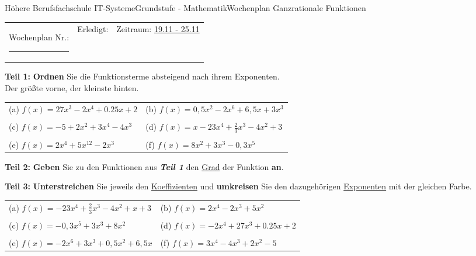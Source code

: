 \documentclass[oneside,openany,headings=optiontotoc,11pt,numbers=noenddot]{scrreprt}
\begin{document}
	\begin{worksheet}{Höhere Berufsfachschule IT-Systeme}{Grundstufe - Mathematik}{Wochenplan Ganzrationale Funktionen}
		\noindent
		\begin{tabularx}{\textwidth}{XXl}
			Wochenplan Nr.: \rule{0.15\textwidth}{1pt} & Erledigt: & Zeitraum: \underline{19.11 - 25.11}
		\end{tabularx}
	
		\begin{framed}
			\noindent
			\textbf{Teil 1:} \textbf{Ordnen} Sie die Funktionsterme absteigend nach ihrem Exponenten.\\
			Der größte vorne, der kleinste hinten.
			\par\noindent
			\begin{tabularx}{\textwidth}{XX}
				(a) \(f(x) = 27x^3 - 2x^4 + 0.25x + 2\) & (b) \(f(x) = 0,5x^2 - 2x^6 +6,5x + 3x^3\)\\
				\\
				(c) \(f(x) = -5 + 2x^2 + 3x^4 - 4x^3\) & (d) \(f(x) = x - 23x^4 + \frac{2}{3}x^3 - 4x^2 + 3\)\\
				\\
				(e) \(f(x) = 2x^4+5x^12-2x^3\) & (f) \(f(x) = 8x^2 + 3x^3 - 0,3x^5\)\\
			\end{tabularx}
		\end{framed}
		\begin{framed}
			\noindent
			\textbf{Teil 2:} \textbf{Geben} Sie zu den Funktionen aus \textit{\textbf{Teil 1}} den \underline{Grad} der Funktion \textbf{an}.
		\end{framed}
		\begin{framed}
			\noindent
			\textbf{Teil 3:} \textbf{Unterstreichen} Sie jeweils den \underline{Koeffizienten} und \textbf{umkreisen} Sie den dazugehörigen \underline{Exponenten} mit der gleichen Farbe.\\
			\par\noindent
			\begin{tabularx}{\textwidth}{XX}
				(a) \(f(x) = - 23x^4 + \frac{2}{3}x^3 - 4x^2 + x + 3\) & (b) \(f(x) = 2x^4- 2x^3 +5x^2\)\\
				\\
				(c) \(f(x) = -0,3x^5 + 3x^3 + 8x^2\) & (d) \(f(x) = -2x^4 + 27x^3 + 0.25x + 2\)\\
				\\
				(e) \(f(x) = -2x^6 + 3x^3 + 0,5x^2 + 6,5x\) & (f) \(f(x) = 3x^4 -4x^3 + 2x^2 - 5\)\\
			\end{tabularx}

\end{framed}
\end{worksheet}
\end{document}

